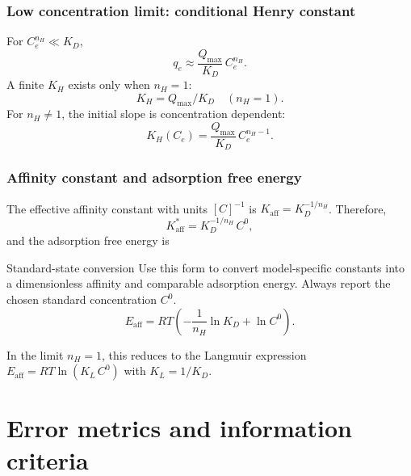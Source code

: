 \documentclass[journal=jacsat,manuscript=article]{achemso}
\begin{document}
\subsubsection{Low concentration limit: conditional Henry constant}

For $C_e^{n_H} \ll K_D$,
\begin{equation}
	q_e \approx \frac{Q_{\max}}{K_D}\, C_e^{n_H}.
\end{equation}
A finite $K_H$ exists only when $n_H = 1$:
\begin{equation}
	K_H = Q_{\max}/K_D \quad (n_H = 1).
\end{equation}
For $n_H \neq 1$, the initial slope is concentration dependent:
\begin{equation}
	K_H(C_e) = \frac{Q_{\max}}{K_D}\, C_e^{n_H - 1}.
\end{equation}

\subsubsection{Affinity constant and adsorption free energy}

The effective affinity constant with units $[C]^{-1}$ is
$K_{\mathrm{aff}} = K_D^{-1/n_H}$. Therefore,
\begin{equation}
	K_{\mathrm{aff}}^{\ast} = K_D^{-1/n_H}\, C^0,
\end{equation}
and the adsorption free energy is
\begin{greenbox}{Standard-state conversion}
	Use this form to convert model-specific constants into a dimensionless affinity and comparable adsorption energy. Always report the chosen standard concentration \(C^0\).
\begin{equation}
	E_{\mathrm{aff}} = RT\!\left(-\frac{1}{n_H}\ln K_D + \ln C^0\right).
\end{equation}
\end{greenbox}
In the limit $n_H = 1$, this reduces to the Langmuir expression
$E_{\mathrm{aff}} = RT\ln(K_L\, C^0)$ with $K_L = 1/K_D$.
	

	
\section{Error metrics and information criteria}
\label{sec:si_error_metrics}
\end{document}

